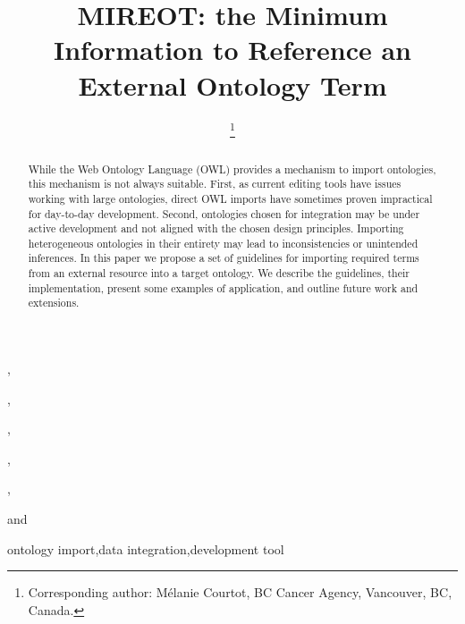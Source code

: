 \documentclass{ao2e}%
\begin{document}
\begin{frontmatter}                           %
%
\title{ MIREOT: the Minimum Information to Reference an External Ontology Term}

\author[A]{ %
\thanks{Corresponding author: M\'elanie Courtot, BC Cancer Agency, Vancouver, BC, Canada.}},
\author[B]{ },
\author[C]{ },
\author[D]{ },
\author[E]{ },
\author[A]{ }
and
\author[F]{ }

\address[A]{BC Cancer Agency, Vancouver, BC, Canada\\
E-mail: mcourtot@gmail.com, rbrinkman@bccrc.ca}

\address[B]{Abcam plc, 332 Cambridge Science Park, Cambridge, CB4 OWN, UK\\
E-mail: fgibson@gmail.com}

\address[C]{CISBAN and School of Computing Science, Newcastle University, Newcastle upon Tyne, UK\\
E-mail: a.l.lister@newcastle.ac.uk}

\address[D]{The European Bioinformatics Institute, Cambridge, CB10 1SD, UK\\
E-mail: malone@ebi.ac.uk}

\address[E]{Institute of Medical Biometry and Medical Informatics (IMBI), University Medical Center, 70104 Freiburg, Germany\\
E-mail: schober@imbi.uni-freiburg.de}

\address[F]{Science Commons, Cambridge, MA, USA\\
E-mail: alanruttenberg@gmail.com}


\begin{abstract}
While the Web Ontology Language (OWL) provides a mechanism to import ontologies, this mechanism is not always suitable.
First, as current editing tools have issues working with large ontologies, direct OWL imports have sometimes proven impractical for day-to-day development.
Second, ontologies chosen for integration may be under active development and not aligned with the chosen design principles. Importing heterogeneous ontologies in their entirety may lead to inconsistencies or unintended inferences.
In this paper we propose a set of guidelines for importing required terms from an external resource into a target ontology.
We describe the guidelines, their implementation, present some examples of application, and outline future work and extensions.
\end{abstract}


\begin{keyword}
ontology import\sep data integration\sep development tool
\end{keyword}

\end{frontmatter}
\end{document}
